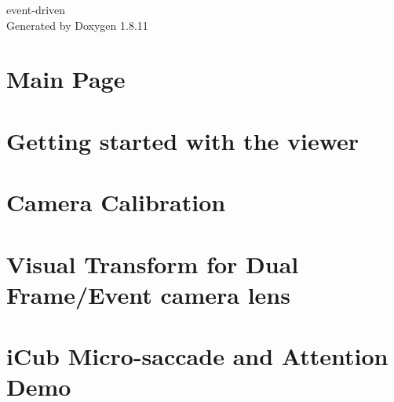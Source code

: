\documentclass[twoside]{book}
\newcommand{\+}{\discretionary{\mbox{\scriptsize$\hookleftarrow$}}{}{}}
\newcommand{\clearemptydoublepage}{%
  \newpage{\pagestyle{empty}\cleardoublepage}%
}
\begin{document}
\hypersetup{pageanchor=false,
             bookmarksnumbered=true,
             pdfencoding=unicode
            }
\begin{titlepage}
\vspace*{7cm}
\begin{center}%
{\Large event-\/driven }\\
\vspace*{1cm}
{\large Generated by Doxygen 1.8.11}\\
\end{center}
\end{titlepage}
\clearemptydoublepage
\tableofcontents
\clearemptydoublepage
{}
\hypersetup{pageanchor=true}

\chapter{Main Page}
\label{index}\hypertarget{index}{}
\chapter{Getting started with the viewer}
\label{md__home_aglover_workspace_projects_event-driven_documentation_1viewer}
\hypertarget{md__home_aglover_workspace_projects_event-driven_documentation_1viewer}{}

\chapter{Camera Calibration}
\label{md__home_aglover_workspace_projects_event-driven_documentation_2calibration}
\hypertarget{md__home_aglover_workspace_projects_event-driven_documentation_2calibration}{}

\chapter{Visual Transform for Dual Frame/\+Event camera lens}
\label{md__home_aglover_workspace_projects_event-driven_documentation_3a.dualcam}
\hypertarget{md__home_aglover_workspace_projects_event-driven_documentation_3a.dualcam}{}

\chapter{i\+Cub Micro-\/saccade and Attention Demo}
\label{md__home_aglover_workspace_projects_event-driven_documentation_3b.autosaccade}
\hypertarget{md__home_aglover_workspace_projects_event-driven_documentation_3b.autosaccade}{}

\end{document}
